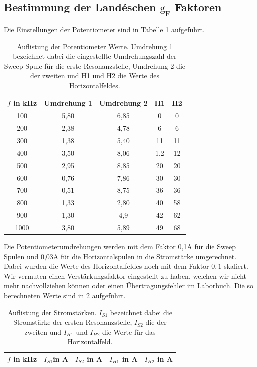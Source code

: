 \subsection{Bestimmung der Landéschen $\text{g}_{\text{F}}$ Faktoren}
Die Einstellungen der Potentiometer sind in Tabelle \ref{tab:Potentiometer} aufgeführt.
\begin{table}[H]
    \centering
    \caption{Auflistung der Potentiometer Werte. Umdrehung 1 bezeichnet dabei die eingestellte Umdrehungszahl der Sweep-Spule für die
    erste Resonanzstelle, Umdrehung 2 die der zweiten und H1 und H2 die Werte des Horizontalfeldes.}
    \label{tab:Potentiometer}
    \begin{tabular}{c|c|c|c|c}
        \toprule
        $f$ in kHz & Umdrehung 1 & Umdrehung 2 & H1 & H2  \\
        \midrule
        100& 5,80 &6,85& 0 & 0 \\
        200& 2,38 &4,78& 6& 6\\
        300& 1,38 &5,40& 11 &11\\
        400& 3,50 &8,06& 1,2 &12\\
        500& 2,95 &8,85& 20 &20\\
        600& 0,76 &7,86& 30 &30\\
        700& 0,51 &8,75& 36 &36\\
        800& 1,33 &2,80& 40 &58\\
        900& 1,30  &4,9 &42 &62\\
        1000& 3,80 &5,89& 49& 68\\
        \bottomrule
    \end{tabular}
\end{table}
Die Potentiometerumdrehungen werden mit dem Faktor 0,1A für die Sweep Spulen und
0,03A für die Horizontalspulen in die Stromstärke umgerechnet. Dabei wurden die Werte des Horizontalfeldes
noch mit dem Faktor $0,1$ skaliert. Wir vermuten einen Verstärkungsfaktor eingestellt zu haben,
welchen wir nicht mehr nachvollziehen können oder einen Übertragungsfehler im Laborbuch. Die so berechneten Werte sind in
\ref{tab:Umrechnung} aufgeführt.
\begin{table}[H]
    \centering
    \caption{Auflistung der Stromstärken. $I_{S1}$ bezeichnet dabei die Stromstärke der
    ersten Resonanzstelle, $I_{S2}$ die der zweiten und $I_{H1}$ und $I_{H2}$ die Werte für das Horizontalfeld.}
    \label{tab:Umrechnung}
    \begin{tabular}{c|c|c|c|c}
        \toprule
        $f$ in kHz & $I_{S1}$in A & $I_{S2}$ in A & $I_{H1}$ in A  & $I_{H2}$ in A   \\
        \midrule
        
        \bottomrule
    \end{tabular}
\end{table}
